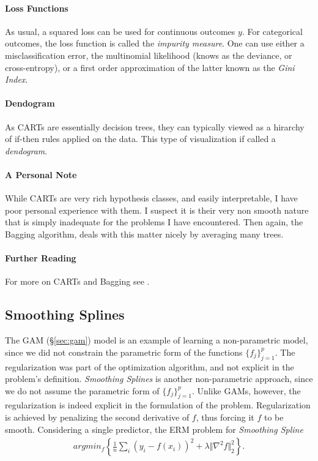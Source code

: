 \documentclass[12pt,a4paper]{article}
\theoremstyle{plain}
\theoremstyle{definition}
\newcommand{\norm}[1]{\Vert #1 \Vert}
\newcommand{\argmin}[2]{argmin_{#1}\left\{ #2 \right\}}
\newcommand{\hyp}{f}
\begin{document}
\paragraph{Loss Functions}
As usual, a squared loss can be used for continuous outcomes $y$.
For categorical outcomes, the loss function is called the \emph{impurity measure}.
One can use either a misclassification error, the multinomial likelihood (knows as the deviance, or cross-entropy), or a first order approximation of the latter known as the \emph{Gini Index}.


\paragraph{Dendogram}
As CARTs are essentially decision trees, they can typically viewed as a hirarchy of if-then rules applied on the data.
This type of visualization if called a \emph{dendogram}.

\paragraph{A Personal Note}
While CARTs are very rich hypothesis classes, and easily interpretable, I have poor personal experience with them. 
I suspect it is their very non smooth nature that is simply inadequate for the problems I have encountered.
Then again, the Bagging algorithm, deals with this matter nicely by averaging many trees.


\paragraph{Further Reading}
For more on CARTs and Bagging see \citep[Section 9]{hastie_elements_2003}.



\subsection{Smoothing Splines}
\label{sec:smoothing_splines}
The GAM (\S\ref{sec:gam}) model is an example of learning a non-parametric model, since we did not constrain the parametric form of the functions $\{f_j\}_{j=1}^p$. The regularization was part of the optimization algorithm, and not explicit in the problem's definition.
\emph{Smoothing Splines} is another non-parametric approach, since we do not assume the parametric form of $\{f_j\}_{j=1}^p$. 
Unlike GAMs, however, the regularization is indeed explicit in the formulation of the problem. 
Regularization is achieved by penalizing the second derivative of $\hyp$, thus forcing it $\hyp$ to be smooth. 
Considering a single predictor, the ERM problem for \emph{Smoothing Spline}
\begin{align}
\label{eq:smoothing_spline}
	 \argmin{\hyp}{\frac{1}{n}\sum_i (y_i-\hyp(x_i))^2 + \lambda \norm{\nabla^2 f}_2^2  }.
\end{align}
\end{document}
